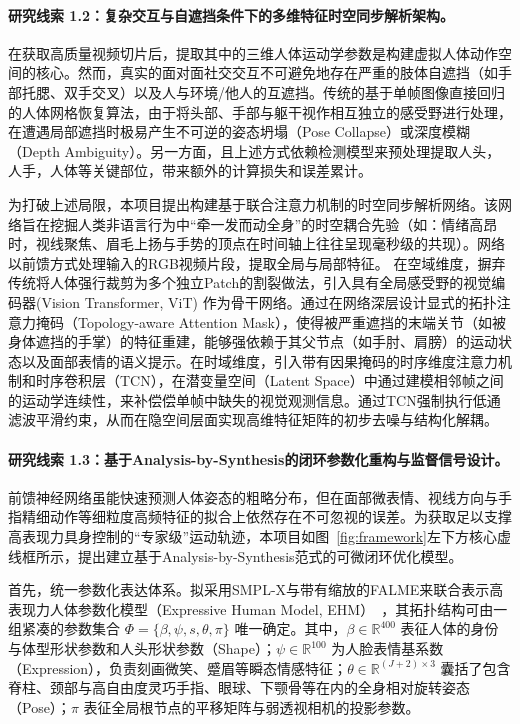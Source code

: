 \paragraph{\textbf{研究线索 1.2：复杂交互与自遮挡条件下的多维特征时空同步解析架构。}}

在获取高质量视频切片后，提取其中的三维人体运动学参数是构建虚拟人体动作空间的核心。然而，真实的面对面社交交互不可避免地存在严重的肢体自遮挡（如手部托腮、双手交叉）以及人与环境/他人的互遮挡。传统的基于单帧图像直接回归的人体网格恢复算法，由于将头部、手部与躯干视作相互独立的感受野进行处理，在遭遇局部遮挡时极易产生不可逆的姿态坍塌（Pose Collapse）或深度模糊（Depth Ambiguity）。另一方面，且上述方式依赖检测模型来预处理提取人头，人手，人体等关键部位，带来额外的计算损失和误差累计。

为打破上述局限，本项目提出构建基于联合注意力机制的时空同步解析网络。该网络旨在挖掘人类非语言行为中“牵一发而动全身”的时空耦合先验（如：情绪高昂时，视线聚焦、眉毛上扬与手势的顶点在时间轴上往往呈现毫秒级的共现）。网络以前馈方式处理输入的RGB视频片段，提取全局与局部特征。
在空域维度，摒弃传统将人体强行裁剪为多个独立Patch的割裂做法，引入具有全局感受野的视觉编码器(Vision Transformer, ViT) 作为骨干网络。通过在网络深层设计显式的拓扑注意力掩码（Topology-aware Attention Mask），使得被严重遮挡的末端关节（如被身体遮挡的手掌）的特征重建，能够强依赖于其父节点（如手肘、肩膀）的运动状态以及面部表情的语义提示。在时域维度，引入带有因果掩码的时序维度注意力机制和时序卷积层（TCN），在潜变量空间（Latent Space）中通过建模相邻帧之间的运动学连续性，来补偿偿单帧中缺失的视觉观测信息。通过TCN强制执行低通滤波平滑约束，从而在隐空间层面实现高维特征矩阵的初步去噪与结构化解耦。

\paragraph{\textbf{研究线索 1.3：基于Analysis-by-Synthesis的闭环参数化重构与监督信号设计。}}

前馈神经网络虽能快速预测人体姿态的粗略分布，但在面部微表情、视线方向与手指精细动作等细粒度高频特征的拟合上依然存在不可忽视的误差。为获取足以支撑高表现力具身控制的“专家级”运动轨迹，本项目如图~\ref{fig:framework}左下方核心虚线框所示，提出建立基于Analysis-by-Synthesis范式的可微闭环优化模型。

首先，统一参数化表达体系。拟采用SMPL-X与带有缩放的FALME来联合表示高表现力人体参数化模型（Expressive Human Model, EHM）~\cite{GUAVA}，其拓扑结构可由一组紧凑的参数集合 $\Phi = \{\beta, \psi, s, \theta, \pi\}$ 唯一确定。其中，$\beta \in \mathbb{R}^{400}$ 表征人体的身份与体型形状参数和人头形状参数（Shape）；$\psi \in \mathbb{R}^{100}$ 为人脸表情基系数（Expression），负责刻画微笑、蹙眉等瞬态情感特征；$\theta \in \mathbb{R}^{(J+2) \times 3}$ 囊括了包含脊柱、颈部与高自由度灵巧手指、眼球、下颚骨等在内的全身相对旋转姿态（Pose）；$\pi$ 表征全局根节点的平移矩阵与弱透视相机的投影参数。


